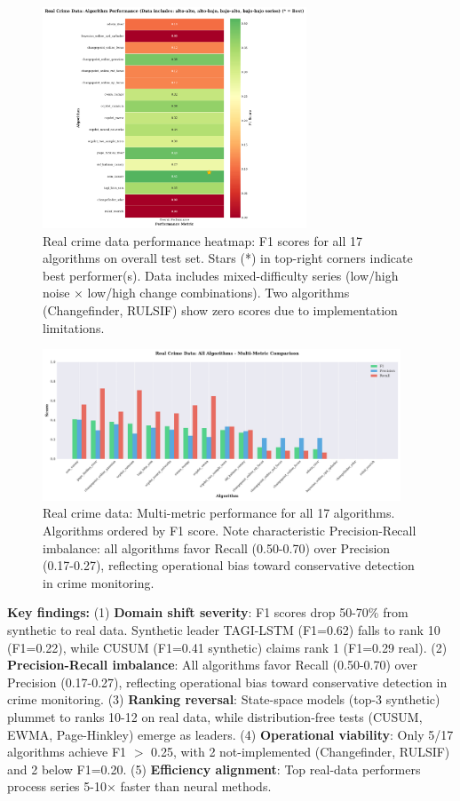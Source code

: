 \begin{figure}[H]
\centering
\includegraphics[width=0.70\textwidth]{figures/fig_real_heatmap.pdf}
\caption{Real crime data performance heatmap: F1 scores for all 17 algorithms on overall test set. Stars (*) in top-right corners indicate best performer(s). Data includes mixed-difficulty series (low/high noise × low/high change combinations). Two algorithms (Changefinder, RULSIF) show zero scores due to implementation limitations.}
\label{fig:real_heatmap}
\end{figure}

\begin{figure}[H]
\centering
\includegraphics[width=0.95\textwidth]{figures/fig_real_barplot.pdf}
\caption{Real crime data: Multi-metric performance for all 17 algorithms. Algorithms ordered by F1 score. Note characteristic Precision-Recall imbalance: all algorithms favor Recall (0.50-0.70) over Precision (0.17-0.27), reflecting operational bias toward conservative detection in crime monitoring.}
\label{fig:real_barplot}
\end{figure}

\textbf{Key findings:} (1) \textbf{Domain shift severity}: F1 scores drop 50-70\% from synthetic to real data. Synthetic leader TAGI-LSTM (F1=0.62) falls to rank 10 (F1=0.22), while CUSUM (F1=0.41 synthetic) claims rank 1 (F1=0.29 real). (2) \textbf{Precision-Recall imbalance}: All algorithms favor Recall (0.50-0.70) over Precision (0.17-0.27), reflecting operational bias toward conservative detection in crime monitoring. (3) \textbf{Ranking reversal}: State-space models (top-3 synthetic) plummet to ranks 10-12 on real data, while distribution-free tests (CUSUM, EWMA, Page-Hinkley) emerge as leaders. (4) \textbf{Operational viability}: Only 5/17 algorithms achieve F1 $>$ 0.25, with 2 not-implemented (Changefinder, RULSIF) and 2 below F1=0.20. (5) \textbf{Efficiency alignment}: Top real-data performers process series 5-10× faster than neural methods.

